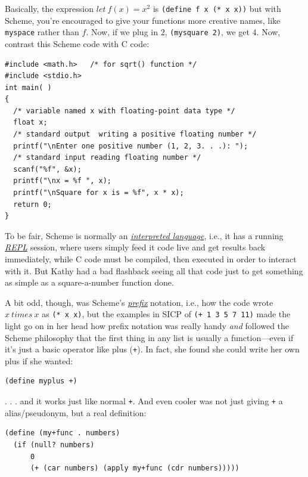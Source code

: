 \documentclass[koma]{article}
\begin{document}
Basically, the expression \(let\ f(x) = x^2\) is \texttt{(define f x (* x x))} but with Scheme, you're encouraged to give your functions more creative names, like \texttt{myspace} rather than \(f\). Now, if we plug in \(2\), \texttt{(mysquare 2)}, we get \(4\). Now, contrast this Scheme code with C code:

\begin{verbatim}
#include <math.h>   /* for sqrt() function */ 
#include <stdio.h> 
int main( ) 
{ 
  /* variable named x with floating-point data type */ 
  float x; 
  /* standard output  writing a positive floating number */ 
  printf("\nEnter one positive number (1, 2, 3. . .): "); 
  /* standard input reading floating number */ 
  scanf("%f", &x); 
  printf("\nx = %f ", x); 
  printf("\nSquare for x is = %f", x * x); 
  return 0; 
}
\end{verbatim}

To be fair, Scheme is normally an \emph{\href{https://en.wikipedia.org/wiki/Interpreted_language}{interpreted language}}, i.e., it has a running \emph{\href{https://en.wikipedia.org/wiki/Read\%25E2\%2580\%2593eval\%25E2\%2580\%2593print_loop}{REPL}} session, where users simply feed it code live and get results back immediately, while C code must be compiled, then executed in order to interact with it. But Kathy had a bad flashback seeing all that code just to get something as simple as a square-a-number function done.

A bit odd, though, was Scheme's \emph{\href{https://en.wikipedia.org/wiki/Polish_notation}{prefix}} notation, i.e., how the code wrote \(x\ times\ x\) as \texttt{(* x x)}, but the examples in SICP of \texttt{(+ 1 3 5 7 11)} made the light go on in her head how prefix notation was really handy \emph{and} followed the Scheme philosophy that the first thing in any list is usually a function---even if it's just a basic operator like plus (\texttt{+}). In fact, she found she could write her own plus if she wanted:

\begin{verbatim}
(define myplus +)
\end{verbatim}

. . . and it works just like normal \texttt{+}. And even cooler was not just giving \texttt{+} a alias/pseudonym, but a real definition:

\begin{verbatim}
(define (my+func . numbers) 
  (if (null? numbers)
      0
      (+ (car numbers) (apply my+func (cdr numbers)))))
\end{verbatim}
\end{document}
